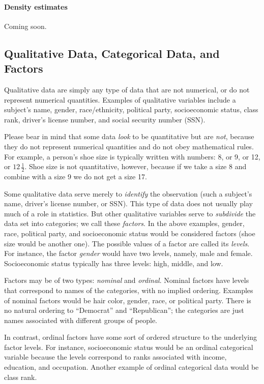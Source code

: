 \documentclass[captions=tableheading]{scrbook}
\begin{document}
\paragraph*{Density estimates}

Coming soon.
\subsection{Qualitative Data, Categorical Data, and Factors}
\label{sec-2-1-3}

\label{sub:Qualitative-Data}

Qualitative data are simply any type of data that are not numerical, or do not represent numerical quantities. Examples of qualitative variables include a subject's name, gender, race/ethnicity, political party, socioeconomic status, class rank, driver's license number, and social security number (SSN).

Please bear in mind that some data \emph{look} to be quantitative but are \emph{not}, because they do not represent numerical quantities and do not obey mathematical rules. For example, a person's shoe size is typically written with numbers: 8, or 9, or 12, or \(12\,\frac{1}{2}\). Shoe size is not quantitative, however, because if we take a size 8 and combine with a size 9 we do not get a size 17.

Some qualitative data serve merely to \emph{identify} the observation (such a subject's name, driver's license number, or SSN). This type of data does not usually play much of a role in statistics. But other qualitative variables serve to \emph{subdivide} the data set into categories; we call these \emph{factors}. In the above examples, gender, race, political party, and socioeconomic status would be considered factors (shoe size would be another one). The possible values of a factor are called its \emph{levels}. For instance, the factor \emph{gender} would have two levels, namely, male and female. Socioeconomic status typically has three levels: high, middle, and low.

Factors may be of two types: \emph{nominal} and \emph{ordinal}. Nominal factors have levels that correspond to names of the categories, with no implied ordering. Examples of nominal factors would be hair color, gender, race, or political party. There is no natural ordering to ``Democrat'' and ``Republican''; the categories are just names associated with different groups of people. 

In contrast, ordinal factors have some sort of ordered structure to the underlying factor levels. For instance, socioeconomic status would be an ordinal categorical variable because the levels correspond to ranks associated with income, education, and occupation. Another example of ordinal categorical data would be class rank.
\end{document}
